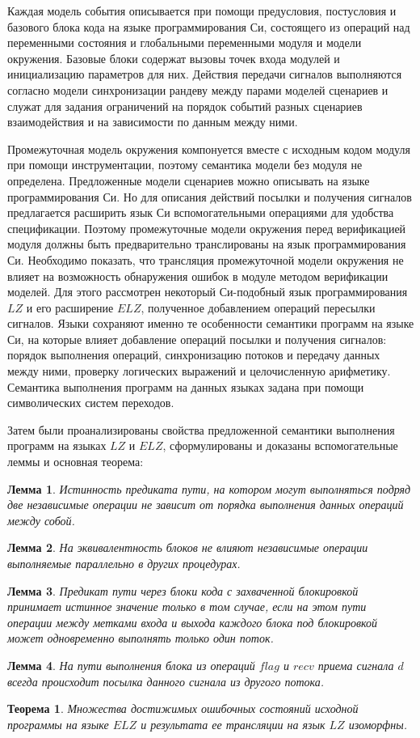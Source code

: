 \documentclass[%
autoref,
colorlinks,  
facsimile,   %
]{disser}
\newtheorem{theorem}{Теорема}{\bfseries}{\itshape}
\newtheorem{lemma}{Лемма}{\bfseries}{\itshape}
\begin{document}
Каждая модель события описывается при помощи предусловия, постусловия и базового блока кода на языке программирования Си, состоящего из операций над переменными состояния и глобальными переменными модуля и модели окружения.
Базовые блоки содержат вызовы точек входа модулей и инициализацию параметров для них.
Действия передачи сигналов выполняются согласно модели синхронизации рандеву между парами моделей сценариев и служат для задания ограничений на порядок событий разных сценариев взаимодействия и на зависимости по данным между ними.

Промежуточная модель окружения компонуется вместе с исходным кодом модуля при помощи инструментации, поэтому семантика модели без модуля не определена.
Предложенные модели сценариев можно описывать на языке программирования Си.
Но для описания действий посылки и получения сигналов предлагается расширить язык Си вспомогательными операциями для удобства спецификации.
Поэтому промежуточные модели окружения перед верификацией модуля должны быть предварительно транслированы на язык программирования Си.
Необходимо показать, что трансляция промежуточной модели окружения не влияет на возможность обнаружения ошибок в модуле методом верификации моделей.
Для этого рассмотрен некоторый Си-подобный язык программирования $LZ$ и его расширение $ELZ$, полученное добавлением операций пересылки сигналов.
Языки сохраняют именно те особенности семантики программ на языке Си, на которые влияет добавление операций посылки и получения сигналов: порядок выполнения операций, синхронизацию потоков и передачу данных между ними, проверку логических выражений и целочисленную арифметику.
Семантика выполнения программ на данных языках задана при помощи символических систем переходов.

Затем были проанализированы свойства предложенной семантики выполнения программ на языках $LZ$ и $ELZ$, сформулированы и доказаны вспомогательные леммы и основная теорема:

\begin{lemma}
Истинность предиката пути, на котором могут выполняться подряд две независимые операции не зависит от порядка выполнения данных операций между собой.
\end{lemma}
\begin{lemma}
На эквивалентность блоков не влияют независимые операции выполняемые параллельно в других процедурах.
\end{lemma}
\begin{lemma}
Предикат пути через блоки кода с захваченной блокировкой принимает истинное значение только в том случае, если на этом пути операции между метками входа и выхода каждого блока под блокировкой может одновременно выполнять только один поток.
\end{lemma}
\begin{lemma}
На пути выполнения блока из операций $flag$ и $recv$ приема сигнала $d$ всегда происходит посылка данного сигнала из другого потока.
\end{lemma}
\begin{theorem}
Множества достижимых ошибочных состояний исходной программы на языке $ELZ$ и результата ее трансляции на язык $LZ$ изоморфны.  
\end{theorem}
\end{document}

